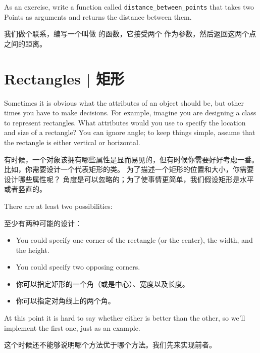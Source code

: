 As an exercise, write a function called \verb"distance_between_points"
that takes two Points as arguments and returns the distance between
them.

我们做个联系，编写一个叫做  的函数，它接受两个  作为参数，然后返回这两个点之间的距离。


\section{Rectangles  |  矩形}
\label{rectangles}

Sometimes it is obvious what the attributes of an object should be,
but other times you have to make decisions.  For example, imagine you
are designing a class to represent rectangles.  What attributes would
you use to specify the location and size of a rectangle?  You can
ignore angle; to keep things simple, assume that the rectangle is
either vertical or horizontal.

有时候，一个对象该拥有哪些属性是显而易见的，但有时候你需要好好考虑一番。
比如，你需要设计一个代表矩形的类。
为了描述一个矩形的位置和大小，你需要设计哪些属性呢？
角度是可以忽略的；为了使事情更简单，我们假设矩形是水平或者竖直的。


There are at least two possibilities:

至少有两种可能的设计：

\begin{itemize}

\item You could specify one corner of the rectangle
(or the center), the width, and the height.

\item You could specify two opposing corners.

\item 你可以指定矩形的一个角（或是中心）、宽度以及长度。

\item 你可以指定对角线上的两个角。

\end{itemize}

At this point it is hard to say whether either is better than
the other, so we'll implement the first one, just as an example.

这个时候还不能够说明哪个方法优于哪个方法。我们先来实现前者。

  

